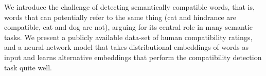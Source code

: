 We introduce the challenge of detecting semantically compatible words, that is, words that can potentially refer to the same thing (cat and hindrance are compatible, cat and dog are not), arguing for its central role in many semantic tasks. We present a publicly available data-set of human compatibility ratings, and a neural-network model that takes distributional embeddings of words as input and learns alternative embeddings that perform the compatibility detection task quite well.
